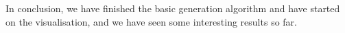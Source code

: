 
In conclusion, we have finished the basic generation algorithm and have started on the visualisation, and we have seen some interesting results so far.
